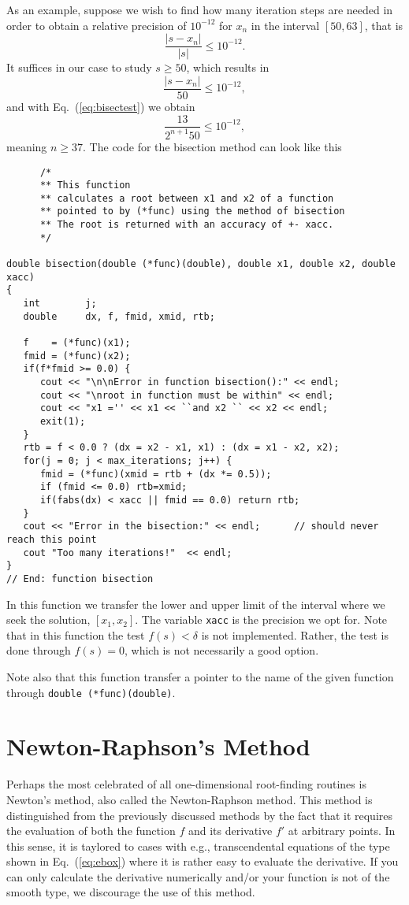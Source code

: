 As an example, suppose we wish to find how many iteration steps are needed
in order to obtain a relative precision of $10^{-12}$ for $x_n$ in the
interval $[50,63]$, that is
\[
    \frac{|s-x_n|}{|s|} \le 10^{-12}.
\]
It suffices in our case to study $s \ge 50$, which results in 
\[
    \frac{|s-x_n|}{50} \le 10^{-12},
\]
and with Eq.~(\ref{eq:bisectest}) we obtain
\[
   \frac{13}{2^{n+1}50}\le 10^{-12},
\]
meaning $n \ge 37$. 
The code for the bisection method can look like this
\lstset{language=c++}
\begin{lstlisting}
      /*
      ** This function
      ** calculates a root between x1 and x2 of a function
      ** pointed to by (*func) using the method of bisection  
      ** The root is returned with an accuracy of +- xacc.
      */

double bisection(double (*func)(double), double x1, double x2, double xacc)
{
   int        j;
   double     dx, f, fmid, xmid, rtb;

   f    = (*func)(x1);
   fmid = (*func)(x2);
   if(f*fmid >= 0.0) {
      cout << "\n\nError in function bisection():" << endl;
      cout << "\nroot in function must be within" << endl;
      cout << "x1 ='' << x1 << ``and x2 `` << x2 << endl;
      exit(1);
   }    
   rtb = f < 0.0 ? (dx = x2 - x1, x1) : (dx = x1 - x2, x2);
   for(j = 0; j < max_iterations; j++) {
      fmid = (*func)(xmid = rtb + (dx *= 0.5));
      if (fmid <= 0.0) rtb=xmid;
      if(fabs(dx) < xacc || fmid == 0.0) return rtb;
   }
   cout << "Error in the bisection:" << endl;      // should never reach this point
   cout "Too many iterations!"  << endl;
} 
// End: function bisection
\end{lstlisting}
In this function we transfer the lower and upper limit of the
interval where we seek the solution, $[x_1,x_2]$. The variable 
\verb$xacc$ is the precision we opt for. Note that in this function 
the test $f(s) < \delta $ is not implemented. Rather, the test
is done through $f(s)=0$, which is not necessarily a good option. 

Note also that this function transfer a pointer to the name
of the given function through \lstinline{double (*func)(double)}.

\section{Newton-Raphson's Method} \label{sec:nr}

Perhaps the most celebrated of all one-dimensional root-finding routines is Newton's
method, also called the Newton-Raphson method. This method is distinguished
from the previously discussed methods
by  the fact that it requires the evaluation
of both the function $f$ and its derivative $f'$ at arbitrary points. In this sense,
it is taylored to cases with e.g., transcendental equations of the type
shown in Eq.\ (\ref{eq:ebox}) where it is rather easy to evaluate the derivative.
If you can only calculate the derivative numerically and/or your function
is not of the smooth type, we discourage the use of this method. 

